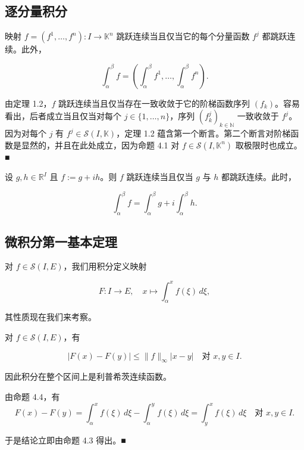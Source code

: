 \subsection*{逐分量积分}

\begin{proposition}

映射 $ f = (f^{1}, \ldots, f^{n}) : I \to \mathbb{K}^{n} $ 跳跃连续当且仅当它的每个分量函数 $ f^{j} $ 都跳跃连续。此外，

\[
\int_{\alpha}^{\beta} f = \left( \int_{\alpha}^{\beta} f^{1}, \ldots, \int_{\alpha}^{\beta} f^{n} \right) .
\]

\proofhead
由定理 1.2，$ f $ 跳跃连续当且仅当存在一致收敛于它的阶梯函数序列 $ (f_k) $。容易看出，后者成立当且仅当对每个 $ j \in \{1, \ldots, n\} $，序列 $ (f_k^{j})_{k \in \mathbb{N}} $ 一致收敛于 $ f^{j} $。因为对每个 $ j $ 有 $ f^{j} \in \mathcal{S}(I, \mathbb{K}) $，定理 1.2 蕴含第一个断言。第二个断言对阶梯函数是显然的，并且在此处成立，因为命题 4.1 对 $ f \in \mathcal{S}(I, \mathbb{K}^{n}) $ 取极限时也成立。\nobreak\hspace{0.35em}■
\end{proposition}

\begin{corollary}

设 $ g, h \in \mathbb{R}^{I} $ 且 $ f := g + ih $。则 $ f $ 跳跃连续当且仅当 $ g $ 与 $ h $ 都跳跃连续。此时，

\[
\int_{\alpha}^{\beta} f = \int_{\alpha}^{\beta} g + i\int_{\alpha}^{\beta} h .
\]
\end{corollary}

\subsection*{微积分第一基本定理}

对 $ f \in \mathcal{S}(I, E) $，我们用积分定义映射

\begin{equation}
F : I \to E , \quad x \mapsto \int_{\alpha}^{x} f(\xi) \, d\xi ,\tag{4.8}
\end{equation}

其性质现在我们来考察。

\begin{theorem}

对 $ f \in \mathcal{S}(I, E) $，有

\[
|F(x) - F(y)| \le \|f\|_{\infty}|x - y| \quad \text{对 } x, y \in I .
\]

因此积分在整个区间上是利普希茨连续函数。

\proofhead
由命题 4.4，有
\[
F(x) - F(y) = \int_{\alpha}^{x} f(\xi) \, d\xi - \int_{\alpha}^{y} f(\xi) \, d\xi = \int_{y}^{x} f(\xi) \, d\xi \quad \text{对 } x, y \in I .
\]

于是结论立即由命题 4.3 得出。\nobreak\hspace{0.35em}■

\end{theorem}

